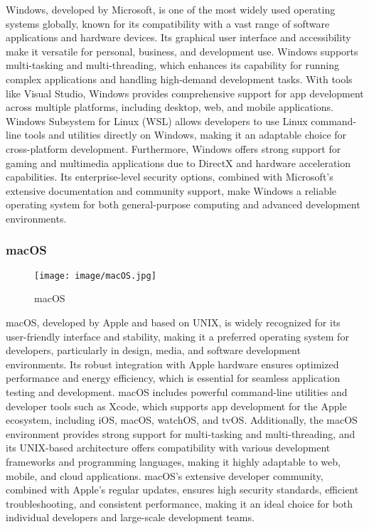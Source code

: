 \documentclass[conference]{IEEEtran}
\begin{document}
\noindent Windows, developed by Microsoft, is one of the most widely used operating systems globally, known for its compatibility with a vast range of software applications and hardware devices. Its graphical user interface and accessibility make it versatile for personal, business, and development use. Windows supports multi-tasking and multi-threading, which enhances its capability for running complex applications and handling high-demand development tasks. With tools like Visual Studio, Windows provides comprehensive support for app development across multiple platforms, including desktop, web, and mobile applications. Windows Subsystem for Linux (WSL) allows developers to use Linux command-line tools and utilities directly on Windows, making it an adaptable choice for cross-platform development. Furthermore, Windows offers strong support for gaming and multimedia applications due to DirectX and hardware acceleration capabilities. Its enterprise-level security options, combined with Microsoft’s extensive documentation and community support, make Windows a reliable operating system for both general-purpose computing and advanced development environments. \\

\subsubsection{macOS}

\begin{figure}[h!]
    \centering
    \texttt{[image: image/macOS.jpg]}
    \caption{macOS}
    \label{fig:enter-label}
\end{figure}

\noindent macOS, developed by Apple and based on UNIX, is widely recognized for its user-friendly interface and stability, making it a preferred operating system for developers, particularly in design, media, and software development environments. Its robust integration with Apple hardware ensures optimized performance and energy efficiency, which is essential for seamless application testing and development. macOS includes powerful command-line utilities and developer tools such as Xcode, which supports app development for the Apple ecosystem, including iOS, macOS, watchOS, and tvOS. Additionally, the macOS environment provides strong support for multi-tasking and multi-threading, and its UNIX-based architecture offers compatibility with various development frameworks and programming languages, making it highly adaptable to web, mobile, and cloud applications. macOS’s extensive developer community, combined with Apple’s regular updates, ensures high security standards, efficient troubleshooting, and consistent performance, making it an ideal choice for both individual developers and large-scale development teams. \\
\end{document}
